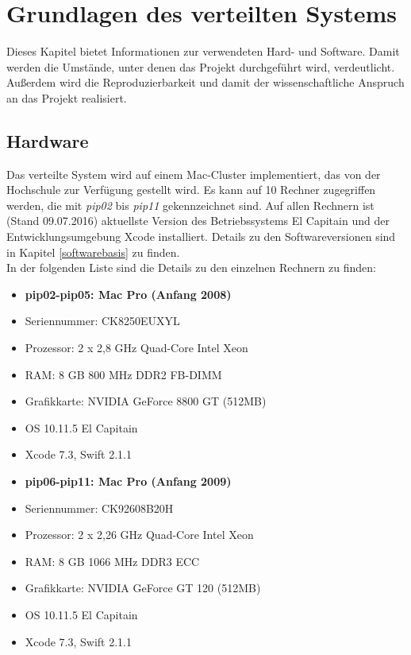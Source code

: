 \chapter{Grundlagen des verteilten Systems}
\label{Grundlagen}
Dieses Kapitel bietet Informationen zur verwendeten Hard- und Software. Damit werden die Umstände, unter denen das Projekt durchgeführt wird, verdeutlicht. Außerdem wird die Reproduzierbarkeit und damit der wissenschaftliche Anspruch an das Projekt realisiert. 

\section{Hardware}
\label{Hardware}
Das verteilte System wird auf einem Mac-Cluster implementiert, das von der Hochschule zur Verfügung gestellt wird. Es kann auf 10 Rechner zugegriffen werden, die mit \emph{pip02} bis \emph{pip11} gekennzeichnet sind. Auf allen Rechnern ist (Stand 09.07.2016) aktuellste Version des Betriebssystems El Capitain und der Entwicklungsumgebung Xcode installiert. Details zu den Softwareversionen sind in Kapitel \ref{softwarebasis} zu finden. \\
In der folgenden Liste sind die Details zu den einzelnen Rechnern zu finden:

\begin{itemize}
	\item\textbf{pip02-pip05: Mac Pro (Anfang 2008)}
	\item[]Seriennummer: CK8250EUXYL
	\item[]Prozessor: 	2 x 2,8 GHz Quad-Core Intel Xeon 
	\item[]RAM: 8 GB 800 MHz DDR2 FB-DIMM
	\item[]Grafikkarte: 	NVIDIA GeForce 8800 GT (512MB)
	\item[]OS 10.11.5 El Capitain
	\item[]Xcode 7.3, Swift 2.1.1 
	\item\textbf{pip06-pip11: Mac Pro (Anfang 2009)}
	\item[] Seriennummer: CK92608B20H
	\item[]Prozessor: 2 x 2,26 GHz Quad-Core Intel Xeon 
	\item[]RAM: 8 GB 1066 MHz DDR3 ECC
	\item[]Grafikkarte: 	NVIDIA GeForce GT 120 (512MB)
	\item[] OS 10.11.5 El Capitain
	\item[] Xcode 7.3, Swift 2.1.1
	\end{itemize}

